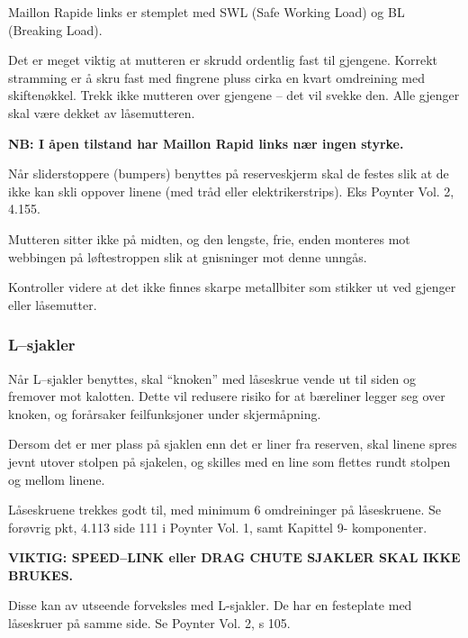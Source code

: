 Maillon Rapide links er stemplet med SWL (Safe Working Load) og BL (Breaking Load).

Det er meget viktig at mutteren er skrudd ordentlig fast til gjengene. Korrekt stramming er å skru fast med fingrene pluss cirka en kvart omdreining med skiftenøkkel. Trekk ikke mutteren over gjengene – det vil svekke den. Alle gjenger skal være dekket av låsemutteren.

\textbf{NB: I åpen tilstand har Maillon Rapid links nær ingen styrke.}

Når sliderstoppere (bumpers) benyttes på reserveskjerm skal de festes slik at de ikke kan skli oppover linene (med tråd eller elektrikerstrips). Eks Poynter Vol. 2, 4.155.

Mutteren sitter ikke på midten, og den lengste, frie, enden monteres mot webbingen på løftestroppen slik at gnisninger mot denne unngås.

Kontroller videre at det ikke finnes skarpe metallbiter som stikker ut ved gjenger eller låsemutter.

\subsubsection{L–sjakler}
Når L–sjakler benyttes, skal ``knoken'' med låseskrue vende ut til siden og fremover mot kalotten. Dette vil redusere risiko for at bæreliner legger seg over knoken, og forårsaker feilfunksjoner under skjermåpning.

Dersom det er mer plass på sjaklen enn det er liner fra reserven, skal linene spres jevnt utover stolpen på sjakelen, og skilles med en line som flettes rundt stolpen og mellom linene.

Låseskruene trekkes godt til, med minimum 6 omdreininger på låseskruene. Se forøvrig pkt, 4.113 side 111 i Poynter Vol. 1, samt Kapittel 9- komponenter.

\textbf{VIKTIG: SPEED–LINK eller DRAG CHUTE SJAKLER SKAL IKKE BRUKES.}

Disse kan av utseende forveksles med L-sjakler. De har en festeplate med låseskruer på samme side. Se Poynter Vol. 2, s 105.
